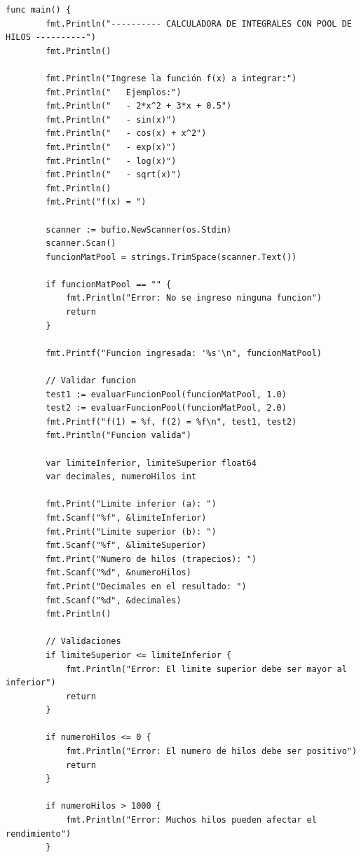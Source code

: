\begin{lstlisting}[style=cpp-style, caption={Función Main en TrapecioPool.go }]
    func main() {
        fmt.Println("---------- CALCULADORA DE INTEGRALES CON POOL DE HILOS ----------")
        fmt.Println()
        
        fmt.Println("Ingrese la función f(x) a integrar:")
        fmt.Println("   Ejemplos:")
        fmt.Println("   - 2*x^2 + 3*x + 0.5")
        fmt.Println("   - sin(x)")
        fmt.Println("   - cos(x) + x^2") 
        fmt.Println("   - exp(x)")
        fmt.Println("   - log(x)")
        fmt.Println("   - sqrt(x)")
        fmt.Println()
        fmt.Print("f(x) = ")
        
        scanner := bufio.NewScanner(os.Stdin)
        scanner.Scan()
        funcionMatPool = strings.TrimSpace(scanner.Text())
        
        if funcionMatPool == "" {
            fmt.Println("Error: No se ingreso ninguna funcion")
            return
        }
        
        fmt.Printf("Funcion ingresada: '%s'\n", funcionMatPool)
        
        // Validar funcion
        test1 := evaluarFuncionPool(funcionMatPool, 1.0)
        test2 := evaluarFuncionPool(funcionMatPool, 2.0)
        fmt.Printf("f(1) = %f, f(2) = %f\n", test1, test2)
        fmt.Println("Funcion valida")
        
        var limiteInferior, limiteSuperior float64
        var decimales, numeroHilos int
        
        fmt.Print("Limite inferior (a): ")
        fmt.Scanf("%f", &limiteInferior)
        fmt.Print("Limite superior (b): ")
        fmt.Scanf("%f", &limiteSuperior)
        fmt.Print("Numero de hilos (trapecios): ")
        fmt.Scanf("%d", &numeroHilos)
        fmt.Print("Decimales en el resultado: ")
        fmt.Scanf("%d", &decimales)
        fmt.Println()
        
        // Validaciones
        if limiteSuperior <= limiteInferior {
            fmt.Println("Error: El limite superior debe ser mayor al inferior")
            return
        }
        
        if numeroHilos <= 0 {
            fmt.Println("Error: El numero de hilos debe ser positivo")
            return
        }
        
        if numeroHilos > 1000 {
            fmt.Println("Error: Muchos hilos pueden afectar el rendimiento")
        }
        

\end{lstlisting}
